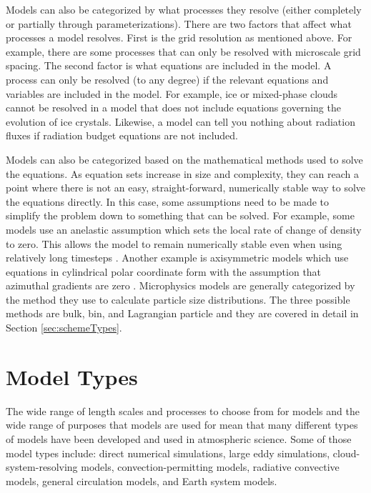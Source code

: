 Models can also be categorized by what processes they resolve (either completely or partially through parameterizations). There are two factors that affect what processes a model resolves. First is the grid resolution as mentioned above. For example, there are some processes that can only be resolved with microscale grid spacing. The second factor is what equations are included in the model. A process can only be resolved (to any degree) if the relevant equations and variables are included in the model. For example, ice or mixed-phase clouds cannot be resolved in a model that does not include equations governing the evolution of ice crystals. Likewise, a model can tell you nothing about radiation fluxes if radiation budget equations are not included.

Models can also be categorized based on the mathematical methods used to solve the equations. As equation sets increase in size and complexity, they can reach a point where there is not an easy, straight-forward, numerically stable way to solve the equations directly. In this case, some assumptions need to be made to simplify the problem down to something that can be solved. For example, some models use an anelastic assumption which sets the local rate of change of density to zero. This allows the model to remain numerically stable even when using relatively long timesteps \citep{rog1989}. Another example is axisymmetric models which use equations in cylindrical polar coordinate form with the assumption that azimuthal gradients are zero \citep{rog1989}. Microphysics models are generally categorized by the method they use to calculate particle size distributions. The three possible methods are bulk, bin, and Lagrangian particle and they are covered in detail in Section \ref{sec:schemeTypes}.

\section{Model Types} \label{sec:modelTypes}
The wide range of length scales and processes to choose from for models and the wide range of purposes that models are used for mean that many different types of models have been developed and used in atmospheric science. Some of those model types include: direct numerical simulations, large eddy simulations, cloud-system-resolving models, convection-permitting models, radiative convective models, general circulation models, and Earth system models. \citep{rama1978,wata2008,zhan2015,grab2019,morr2020}


